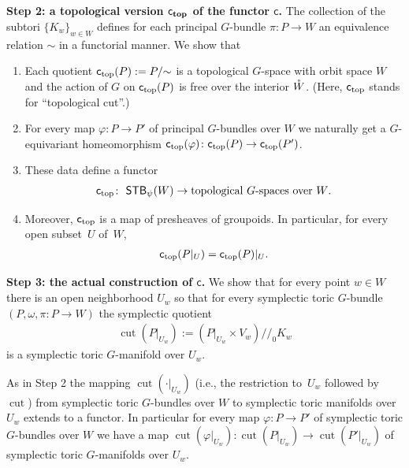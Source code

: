 \documentclass[10pt,a4paper]{amsart}
\numberwithin{equation}{section}
\begin{document}
  {\bf Step 2: a topological version $\boldsymbol{{\textsf{c}_{\rm top}}}$ of the
  functor $\boldsymbol{{\textsf{c}}}$.} The collection of the subtori $\{K_w\}_{w\in
  W}$ def\/ines for each principal $G$-bundle $\pi\colon P\to W$ an
equivalence relation $\sim$ in a functorial manner.  We show that
\begin{enumerate}\itemsep=0pt
\item Each quotient ${\textsf{c}_{\rm top}} (P):= P/{\sim}$ is a topological $G$-space
with orbit space $W$ and the action of $G$ on ${\textsf{c}_{\rm top}}(P)$
is free over the interior ${\mathaccent23{W}}$.
(Here, ${\textsf{c}_{\rm top}}$ stands for ``topological cut''.)
\item For every map $\varphi\colon P\to P'$ of principal $G$-bundles over
  $W$ we naturally get a $G$-equivariant homeomorphism
  ${\textsf{c}_{\rm top}}(\varphi)\colon {\textsf{c}_{\rm top}}(P)\to {\textsf{c}_{\rm top}}(P')$.
\item These data def\/ine a functor
\begin{gather*}
{\textsf{c}_{\rm top}}\colon \  {\textsf{STB}}_\psi (W)\to \text{topological $G$-spaces over $W$}.
\end{gather*}
\item Moreover, ${\textsf{c}_{\rm top}}$  is a map of presheaves of groupoids.
      In particular, for every open subset~$U$ of~$W$,
\begin{gather*}
{\textsf{c}_{\rm top}}(P|_U)= {\textsf{c}_{\rm top}}(P)|_U.
\end{gather*}
\end{enumerate}

{\bf Step 3: the actual construction of $\boldsymbol{{\textsf{c}}}$.} We
show that for every point $w\in W$ there is an open neighborhood
$U_w$ so that for every symplectic toric $G$-bundle $(P,\omega, \pi\colon P\to
W)$ the symplectic quotient
\begin{gather*}
\operatorname{cut}(P|_{U_w}):= (P|_{U_w} \times V_w)/\!/_0  K_w
\end{gather*}
is a symplectic toric $G$-manifold over $U_w$.

As in Step 2 the mapping $\operatorname{cut} ({\cdot}|_{U_w})$ (i.e.,
the restriction to~$U_w$ followed by $\operatorname{cut}$) from symplectic toric
$G$-bundles over $W$ to symplectic toric manifolds over $U_w$ extends
to a functor. In particular for every map $\varphi\colon P\to P'$ of
symplectic toric $G$-bundles over $W$ we have a map $\operatorname{cut}
(\varphi|_{U_w})\colon  \operatorname{cut}(P|_{U_w})\to \operatorname{cut}(P'|_{U_w})$ of
symplectic toric $G$-manifolds over $U_w$.
\end{document}

